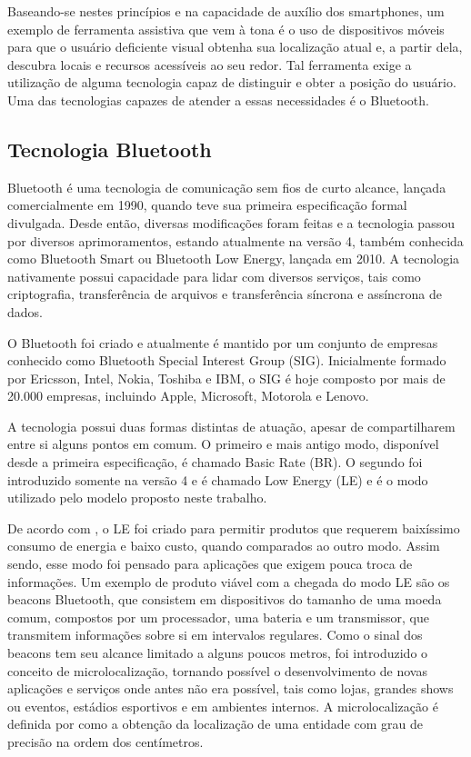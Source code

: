 \documentclass[twoside,english,brazilian]{UNISINOSartigo}
\begin{document}
Baseando-se nestes princípios e na capacidade de auxílio dos smartphones, um exemplo de ferramenta assistiva que vem à tona é o uso de dispositivos móveis para que o usuário deficiente visual obtenha sua localização atual e, a partir dela, descubra locais e recursos acessíveis ao seu redor. Tal ferramenta exige a utilização de alguma tecnologia capaz de distinguir e obter a posição do usuário. Uma das tecnologias capazes de atender a essas necessidades é o Bluetooth.

\subsection{Tecnologia Bluetooth}
Bluetooth é uma tecnologia de comunicação sem fios de curto alcance, lançada comercialmente em 1990, quando teve sua primeira especificação formal divulgada. Desde então, diversas modificações foram feitas e a tecnologia passou por diversos aprimoramentos, estando atualmente na versão 4, também conhecida como Bluetooth Smart ou Bluetooth Low Energy, lançada em 2010. A tecnologia nativamente possui capacidade para lidar com diversos serviços, tais como criptografia, transferência de arquivos e transferência síncrona e assíncrona de dados.

O Bluetooth foi criado e atualmente é mantido por um conjunto de empresas conhecido como Bluetooth Special Interest Group (SIG). Inicialmente formado por Ericsson, Intel, Nokia, Toshiba e IBM, o SIG é hoje composto por mais de 20.000 empresas, incluindo Apple, Microsoft, Motorola e Lenovo.

A tecnologia possui duas formas distintas de atuação, apesar de compartilharem entre si alguns pontos em comum. O primeiro e mais antigo modo, disponível desde a primeira especificação, é chamado Basic Rate (BR). O segundo foi introduzido somente na versão 4 e é chamado Low Energy (LE) e é o modo utilizado pelo modelo proposto neste trabalho.

De acordo com , o LE foi criado para permitir produtos que requerem baixíssimo consumo de energia e baixo custo, quando comparados ao outro modo. Assim sendo, esse modo foi pensado para aplicações que exigem pouca troca de informações. Um exemplo de produto viável com a chegada do modo LE são os beacons Bluetooth, que consistem em dispositivos do tamanho de uma moeda comum, compostos por um processador, uma bateria e um transmissor, que transmitem informações sobre si em intervalos regulares. Como o sinal dos beacons tem seu alcance limitado a alguns poucos metros, foi introduzido o conceito de microlocalização, tornando possível o desenvolvimento de novas aplicações e serviços onde antes não era possível, tais como lojas, grandes shows ou eventos, estádios esportivos e em ambientes internos. A microlocalização é definida por  como a obtenção da localização de uma entidade com grau de precisão na ordem dos centímetros. 
\end{document}
